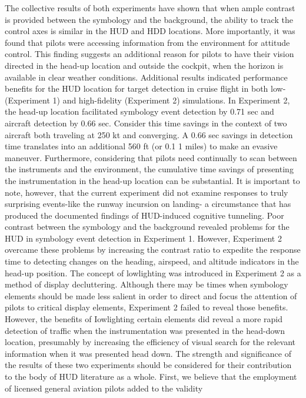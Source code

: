 \documentclass[utf8,bachelor,manualbib]{gradu3}
\begin{document}
The collective results of both experiments have shown that when ample contrast is
provided between the symbology and the background, the ability to track the control
axes is similar in the HUD and HDD locations. More importantly, it was found that
pilots were accessing information from the environment for attitude control. This
finding suggests an additional reason for pilots to have their vision directed in the
head-up location and outside the cockpit, when the horizon is available in clear
weather conditions.
Additional results indicated performance benefits for the HUD location for
target detection in cruise flight in both low-(Experiment 1) and high-fidelity
(Experiment 2) simulations. In Experiment 2, the head-up location facilitated
symbology event detection by 0.71 sec and aircraft detection by 0.66 sec. Consider
this time savings in the context of two aircraft both traveling at 250 kt and
converging. A 0.66 sec savings in detection time translates into an additional 560
ft (or 0.1 1 miles) to make an evasive maneuver. Furthermore, considering that pilots
need continually to scan between the instruments and the environment, the cumulative
time savings of presenting the instrumentation in the head-up location can
be substantial. It is important to note, however, that the current experiment did not
examine responses to truly surprising events-like the runway incursion on landing-
a circumstance that has produced the documented findings of HUD-induced
cognitive tunneling.
Poor contrast between the symbology and the background revealed problems
for the HUD in symbology event detection in Experiment 1. However, Experiment
2 overcame these problems by increasing the contrast ratio to expedite the response
time to detecting changes on the heading, airspeed, and altitude indicators in the
head-up position. The concept of lowlighting was introduced in Experiment 2 as a
method of display decluttering. Although there may be times when symbology
elements should be made less salient in order to direct and focus the attention of
pilots to critical display elements, Experiment 2 failed to reveal those benefits.
However, the benefits of Iowlighting certain elements did reveal a more rapid
detection of traffic when the instrumentation was presented in the head-down
location, presumably by increasing the efficiency of visual search for the relevant
information when it was presented head down.
The strength and significance of the results of these two experiments should be
considered for their contribution to the body of HUD literature as a whole. First, we
believe that the employment of licensed general aviation pilots added to the validity
\end{document}
